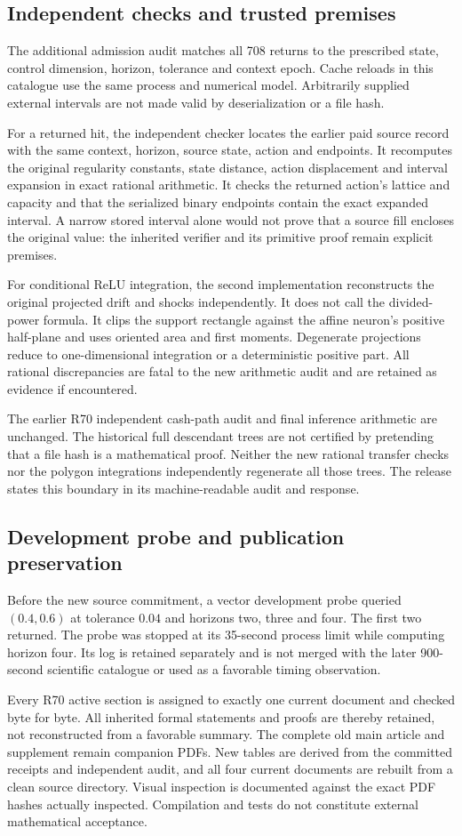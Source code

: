 \subsection{Independent checks and trusted premises}
The additional admission audit matches all 708 returns to the prescribed state, control dimension, horizon, tolerance and context epoch. Cache reloads in this catalogue use the same process and numerical model. Arbitrarily supplied external intervals are not made valid by deserialization or a file hash.

For a returned hit, the independent checker locates the earlier paid source record with the same context, horizon, source state, action and endpoints. It recomputes the original regularity constants, state distance, action displacement and interval expansion in exact rational arithmetic. It checks the returned action's lattice and capacity and that the serialized binary endpoints contain the exact expanded interval. A narrow stored interval alone would not prove that a source fill encloses the original value: the inherited verifier and its primitive proof remain explicit premises.

For conditional ReLU integration, the second implementation reconstructs the original projected drift and shocks independently. It does not call the divided-power formula. It clips the support rectangle against the affine neuron's positive half-plane and uses oriented area and first moments. Degenerate projections reduce to one-dimensional integration or a deterministic positive part. All rational discrepancies are fatal to the new arithmetic audit and are retained as evidence if encountered.

The earlier R70 independent cash-path audit and final inference arithmetic are unchanged. The historical full descendant trees are not certified by pretending that a file hash is a mathematical proof. Neither the new rational transfer checks nor the polygon integrations independently regenerate all those trees. The release states this boundary in its machine-readable audit and response.

\subsection{Development probe and publication preservation}
Before the new source commitment, a vector development probe queried $(0.4,0.6)$ at tolerance $0.04$ and horizons two, three and four. The first two returned. The probe was stopped at its 35-second process limit while computing horizon four. Its log is retained separately and is not merged with the later 900-second scientific catalogue or used as a favorable timing observation.

Every R70 active section is assigned to exactly one current document and checked byte for byte. All inherited formal statements and proofs are thereby retained, not reconstructed from a favorable summary. The complete old main article and supplement remain companion PDFs. New tables are derived from the committed receipts and independent audit, and all four current documents are rebuilt from a clean source directory. Visual inspection is documented against the exact PDF hashes actually inspected. Compilation and tests do not constitute external mathematical acceptance.
